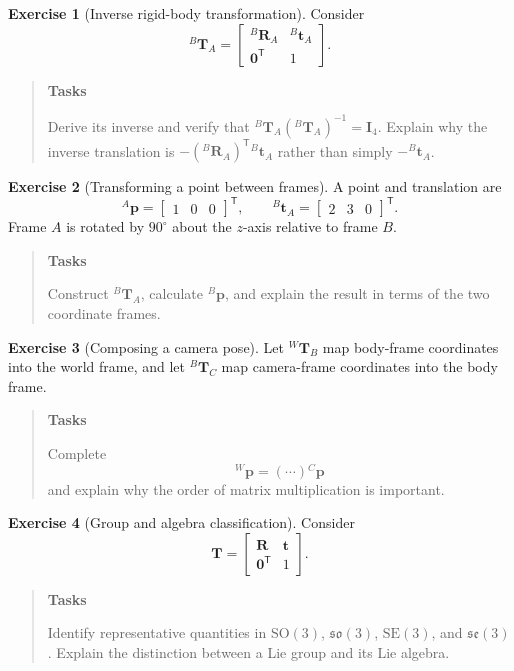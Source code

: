 \documentclass[10pt,a4paper]{article}
\numberwithin{equation}{section}
\newcommand{\SOthree}{\mathrm{SO}(3)}
\newcommand{\SEthree}{\mathrm{SE}(3)}
\newcommand{\sothree}{\mathfrak{so}(3)}
\newcommand{\sethree}{\mathfrak{se}(3)}
\theoremstyle{definition}
\theoremstyle{exercisestyle}
\newtheorem{exercise}{Exercise}[section]
\newenvironment{tasks}
    {\par\begin{quote}\small\textbf{Tasks}\par\smallskip}
    {\end{quote}}
\begin{document}
\begin{exercise}[Inverse rigid-body transformation]
Consider
\[
    {}^B\mathbf{T}_A=
    \begin{bmatrix}
        {}^B\mathbf{R}_A&{}^B\mathbf{t}_A\\
        \mathbf{0}^{\mathsf T}&1
    \end{bmatrix}.
\]
\begin{tasks}
Derive its inverse and verify that
${}^B\mathbf{T}_A({}^B\mathbf{T}_A)^{-1}=\mathbf{I}_4$. Explain why the
inverse translation is
$-({}^B\mathbf{R}_A)^{\mathsf T}{}^B\mathbf{t}_A$ rather than simply
$-{}^B\mathbf{t}_A$.
\end{tasks}
\end{exercise}

\begin{exercise}[Transforming a point between frames]
A point and translation are
\[
    {}^A\mathbf{p}=\begin{bmatrix}1&0&0\end{bmatrix}^{\mathsf T},
    \qquad
    {}^B\mathbf{t}_A=\begin{bmatrix}2&3&0\end{bmatrix}^{\mathsf T}.
\]
Frame $A$ is rotated by $90^\circ$ about the $z$-axis relative to frame $B$.
\begin{tasks}
Construct ${}^B\mathbf{T}_A$, calculate ${}^B\mathbf{p}$, and explain the
result in terms of the two coordinate frames.
\end{tasks}
\end{exercise}

\begin{exercise}[Composing a camera pose]
Let ${}^W\mathbf{T}_B$ map body-frame coordinates into the world frame, and
let ${}^B\mathbf{T}_C$ map camera-frame coordinates into the body frame.
\begin{tasks}
Complete
\[
    {}^W\mathbf{p}=(\cdots){}^C\mathbf{p}
\]
and explain why the order of matrix multiplication is important.
\end{tasks}
\end{exercise}

\begin{exercise}[Group and algebra classification]
Consider
\[
    \mathbf{T}=\begin{bmatrix}
        \mathbf{R}&\mathbf{t}\\\mathbf{0}^{\mathsf T}&1
    \end{bmatrix}.
\]
\begin{tasks}
Identify representative quantities in $\SOthree$, $\sothree$, $\SEthree$,
and $\sethree$. Explain the distinction between a Lie group and its Lie
algebra.
\end{tasks}
\end{exercise}
\end{document}
